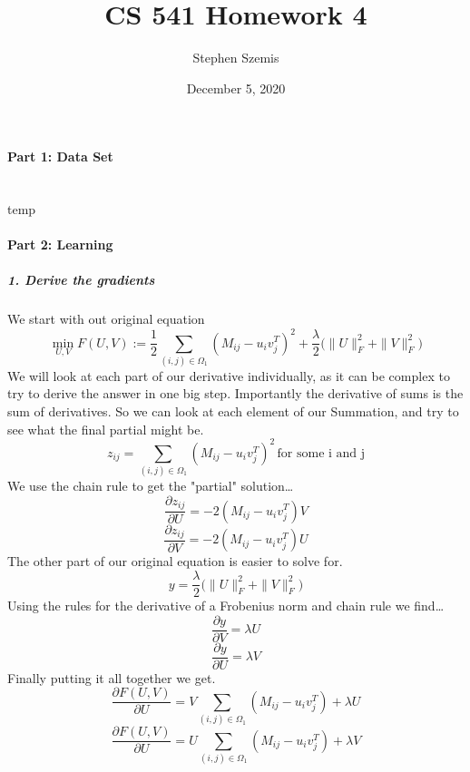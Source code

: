 \documentclass[12pt]{article}
\begin{document}
    \title{CS 541 Homework 4}
    \author{Stephen Szemis}
    \date{ December 5, 2020}
    \maketitle

    \paragraph{Part 1: Data Set}~\\
    temp

    \paragraph{Part 2: Learning}
    \subparagraph{1. Derive the gradients}
    We start with out original equation
    \[
        \operatorname*{min}_{U,V} F(U, V) :=
        \frac{1}{2} \sum_{(i,j) \in \Omega_{1}} (M_{ij} - u_i v_j^T)^2 
        + \frac{\lambda}{2} \bigl( \parallel U \parallel_{F}^{2} + \parallel V \parallel_{F}^{2} \big)
    \]
    We will look at each part of our derivative individually, as it can be complex to try to derive the answer in one 
    big step. Importantly the derivative of sums is the sum of derivatives. So we can look at each element of our Summation, and 
    try to see what the final partial might be.
    \[
        z_{ij} = \sum_{(i,j) \in \Omega_{1}} (M_{ij} - u_i v_j^T)^2 \, \text{for some i and j}
    \]
    We use the chain rule to get the "partial" solution\dots
    \[
        \frac{\partial z_{ij}}{\partial U} = -2(M_{ij} - u_{i}v_{j}^{T})V
    \]
    \[
        \frac{\partial z_{ij}}{\partial V} = -2(M_{ij} - u_{i}v_{j}^{T})U
    \]
    The other part of our original equation is easier to solve for.
    \[
        y = \frac{\lambda}{2} \bigl( \parallel U \parallel_{F}^{2} + \parallel V \parallel_{F}^{2} \big)
    \]
    Using the rules for the derivative of a Frobenius norm and chain rule we find\dots
    \[
        \frac{\partial y}{\partial V} = \lambda U
    \]
    \[
        \frac{\partial y}{\partial U} = \lambda V
    \]
    Finally putting it all together we get.
    \[
        \frac{\partial F(U, V)}{\partial U} = V\sum_{(i,j) \in \Omega_{1}} (M_{ij} - u_i v_j^T) + \lambda U
    \]
    \[
        \frac{\partial F(U, V)}{\partial U} = U\sum_{(i,j) \in \Omega_{1}} (M_{ij} - u_i v_j^T) + \lambda V
    \]
\end{document}
